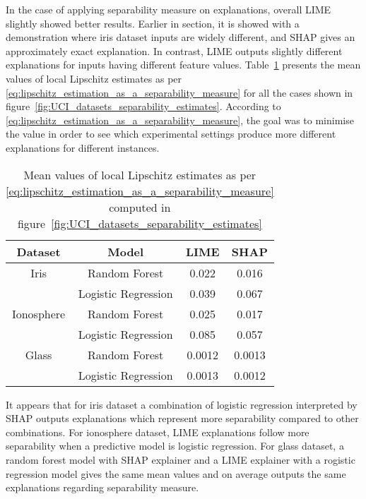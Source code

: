 \documentclass[english]{tktltiki2}
\theoremstyle{definition}
\theoremstyle{remark}
\begin{document}
In the case of applying separability measure on explanations, overall LIME slightly showed better results. Earlier in section, it is showed with a demonstration where iris dataset inputs are widely different, and SHAP gives an approximately exact explanation. In contrast, LIME outputs slightly different explanations for inputs having different feature values. Table~\ref{table:lipschitz_estimation_separability_aggregated_datasets_UCI} presents the mean values of local Lipschitz estimates as per \eqref{eq:lipschitz_estimation_as_a_separability_measure} for all the cases shown in figure~\ref{fig:UCI_datasets_separability_estimates}. According to \eqref{eq:lipschitz_estimation_as_a_separability_measure}, the goal was to minimise the value in order to see which experimental settings produce more different explanations for different instances.

\begin{table}[H]
	\caption{Mean values of local Lipschitz estimates as per \eqref{eq:lipschitz_estimation_as_a_separability_measure} computed in figure~\ref{fig:UCI_datasets_separability_estimates}}
	\label{table:lipschitz_estimation_separability_aggregated_datasets_UCI}
	\begin{center}
		\begin{tabular}{|c|c|c|c|}
			\hline
			\textbf{Dataset} & \textbf{Model} & \textbf{LIME} & \textbf{SHAP} \\ \hline
			
			Iris & Random Forest & 0.022 & 0.016  \\ \hline
			& Logistic Regression & 0.039 & 0.067 \\ \hline
			
			Ionosphere & Random Forest & 0.025 & 0.017 \\ \hline
			& Logistic Regression & 0.085 & 0.057 \\ \hline
			
			Glass & Random Forest & 0.0012 & 0.0013 \\ \hline
			& Logistic Regression & 0.0013 & 0.0012 \\ \hline
			
		\end{tabular}
	\end{center}
\end{table}

It appears that for iris dataset a combination of logistic regression interpreted by SHAP outputs explanations which represent more separability compared to other combinations. For ionosphere dataset, LIME explanations follow more separability when a predictive model is logistic regression. For glass dataset, a random forest model with SHAP explainer and a LIME explainer with a rogistic regression model gives the same mean values and on average outputs the same explanations regarding separability measure.
\end{document}
